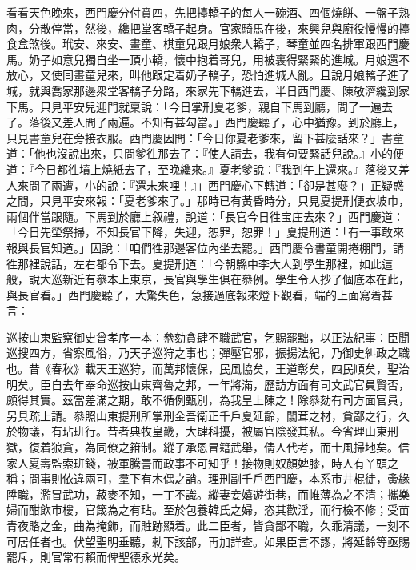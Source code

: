 看看天色晚來，西門慶分付賁四，先把擡轎子的每人一碗酒、四個燒餅、一盤子熟肉，分散停當，然後，纔把堂客轎子起身。官家騎馬在後，來興兒與廚役慢慢的擡食盒煞後。玳安、來安、畫童、棋童兒跟月娘衆人轎子，琴童並四名排軍跟西門慶馬。奶子如意兒獨自坐一頂小轎，懷中抱着哥兒，用被裹得緊緊的進城。月娘還不放心，又使囘畫童兒來，叫他跟定着奶子轎子，恐怕進城人亂。{}且說月娘轎子進了城，就與喬家那邊衆堂客轎子分路，來家先下轎進去，半日西門慶、陳敬濟纔到家下馬。只見平安兒迎門就稟說：「今日掌刑夏老爹，親自下馬到廳，問了一遍去了。落後又差人問了兩遍。不知有甚勾當。」{}西門慶聽了，心中猶豫。到於廳上，只見書童兒在旁接衣服。西門慶因問：「今日你夏老爹來，留下甚麼話來？」書童道：「他也沒說出來，只問爹徃那去了：『使人請去，我有句要緊話兒說。』小的便道：『今日都徃墳上燒紙去了，至晚纔來。』夏老爹說：『我到午上還來。』落後又差人來問了兩遭，小的說：『還未來哩！』」西門慶心下轉道：「卻是甚麼？」正疑惑之間，只見平安來報：「夏老爹來了。」那時已有黃昏時分，只見夏提刑便衣坡巾，兩個伴當跟隨。下馬到於廳上叙禮，說道：「長官今日徃宝庄去來？」西門慶道：「今日先塋祭掃，不知長官下降，失迎，恕罪，恕罪！」夏提刑道：「有一事敢來報與長官知道。」因說：「咱們徃那邊客位內坐去罷。」西門慶令書童開捲棚門，請徃那裡說話，左右都令下去。夏提刑道：「今朝縣中李大人到學生那裡，如此這般，說大巡新近有叅本上東京，長官與學生俱在叅例。學生令人抄了個底本在此，與長官看。」西門慶聽了，大驚失色，急接過底報來燈下觀看，端的上面寫着甚言：

巡按山東監察御史曾孝序一本：叅劾貪肆不職武官，乞賜罷黜，以正法紀事：臣聞巡搜四方，省察風俗，乃天子巡狩之事也；彈壓官邪，振揚法紀，乃御史糾政之職也。昔《春秋》載天王巡狩，而萬邦懷保，民風協矣，王道彰矣，四民順矣，聖治明矣。臣自去年奉命巡按山東齊魯之邦，一年將滿，歷訪方面有司文武官員賢否，頗得其實。茲當差滿之期，敢不循例甄別，為我皇上陳之！除叅劾有司方面官員，另具疏上請。叅照山東提刑所掌刑金吾衛正千戶夏延齡，闒茸之材，貪鄙之行，久於物議，有玷班行。昔者典牧皇畿，大肆科擾，被屬官陰發其私。今省理山東刑獄，復着狼貪，為同僚之箝制。縱子承恩冒籍武舉，倩人代考，而士風掃地矣。信家人夏壽監索班錢，被軍騰詈而政事不可知乎！接物則奴顏婢膝，時人有丫頭之稱；問事則依違兩可，羣下有木偶之誚。理刑副千戶西門慶，本系市井棍徒，夤緣陞職，濫冒武功，菽麥不知，一丁不識。縱妻妾嬉遊街巷，而帷薄為之不清；攜樂婦而酣飲市樓，官箴為之有玷。至於包養韓氏之婦，恣其歡淫，而行檢不修；受苗青夜賂之金，曲為掩飾，而賍跡顯着。此二臣者，皆貪鄙不職，久乖清議，一刻不可居任者也。伏望聖明垂聽，勑下該部，再加詳查。如果臣言不謬，將延齡等亟賜罷斥，則官常有賴而俾聖德永光矣。

